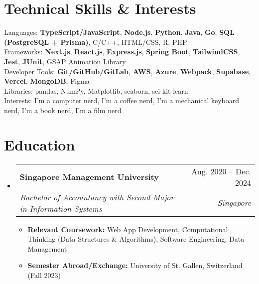 \documentclass[letterpaper,11pt]{article}
\makeatletter
\newcommand{\resumeItem}[1]{
  \item\small{
    {#1 \vspace{-2pt}}
  }
}
\newcommand{\resumeSubheading}[4]{
  \vspace{-2pt}\item
    \begin{tabular*}{0.97\textwidth}[t]{l@{\extracolsep{\fill}}r}
      \textbf{#1} & #2 \\
      \textit{\small#3} & \textit{\small #4} \\
    \end{tabular*}\vspace{-7pt}
}
\newcommand{\resumeSubHeadingListStart}{\begin{itemize}[leftmargin=0.15in, label={}]}
\newcommand{\resumeSubHeadingListEnd}{\end{itemize}}
\newcommand{\resumeItemListStart}{\begin{itemize}}
\newcommand{\resumeItemListEnd}{\end{itemize}\vspace{-5pt}}
\makeatother
\begin{document}
\section{Technical Skills \& Interests}
 \begin{itemize}[leftmargin=0.15in, label={}]
    \small{\item{
      {Languages}{: \textbf{TypeScript/JavaScript}, \textbf{Node.js}, \textbf{Python}, \textbf{Java}, \textbf{Go}, \textbf{SQL (PostgreSQL + Prisma)}, C/C++, HTML/CSS, R, PHP} \\
      {Frameworks}{: \textbf{Next.js}, \textbf{React.js}, \textbf{Express.js}, \textbf{Spring Boot}, \textbf{TailwindCSS}, \textbf{Jest}, \textbf{JUnit}, GSAP Animation Library} \\
      {Developer Tools}{: \textbf{Git/GitHub/GitLab}, \textbf{AWS}, \textbf{Azure}, \textbf{Webpack}, \textbf{Supabase}, \textbf{Vercel}, \textbf{MongoDB}, Figma} \\
     {Libraries}{: pandas, NumPy, Matplotlib, seaborn, sci-kit learn} \\
     {Interests}{: I’m a computer nerd, I’m a coffee nerd, I’m a mechanical keyboard nerd, I’m a book nerd, I’m a film nerd}
    }}
 \end{itemize}


\section{Education}
  \resumeSubHeadingListStart
    \resumeSubheading
      {Singapore Management University}{Aug. 2020 -- Dec. 2024}
      {Bachelor of Accountancy with Second Major in Information Systems}{Singapore}
      \resumeItemListStart
        \resumeItem{\textbf {Relevant Coursework:} Web App Development, Computational Thinking (Data Structures \& Algorithms), Software Engineering, Data Management}
        \resumeItem{\textbf {Semester Abroad/Exchange:} University of St. Gallen, Switzerland (Fall 2023)}
      \resumeItemListEnd
  \resumeSubHeadingListEnd


\end{document}

